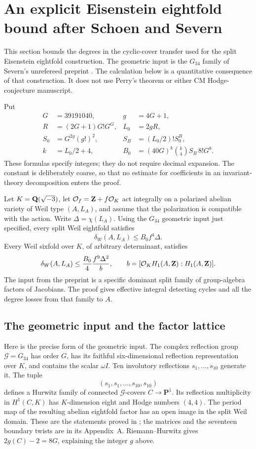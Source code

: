 \section{An explicit Eisenstein eightfold bound after Schoen and Severn}
\label{sec:eisenstein-eightfolds}
This section bounds the degrees in the cyclic-cover transfer used for the
split Eisenstein eightfold construction. The geometric input is the
$G_{34}$ family of Severn's unrefereed preprint
\cite[Proposition~8.5, \S9 and Appendix~A]{Severn}. The calculation below
is a quantitative consequence of that construction. It does not use
Perry's theorem or either CM Hodge-conjecture manuscript.

Put
\begin{align*}
 G&=39191040,& g&=4G+1,\\
 R&=(2G+1)G!G^G,& L_0&=2gR,\\
 S_0&=G^{2g}(g!)^2,& S_B&=(L_0/2)!S_0^R,\\
 k&=L_0/2+4,&
 B_0&=(40G)^k\binom{k}{4}S_B\,8!G^8.
\end{align*}
These formulas specify integers; they do not require decimal expansion.
The constant is deliberately coarse, so that no estimate for coefficients
in an invariant-theory decomposition enters the proof.

\begin{theorem}\label{thm:eisenstein-eightfolds}
Let $K=\mathbf Q(\sqrt{-3})$, let $\mathcal O_f=\mathbf Z+f\mathcal O_K$ act
integrally on a polarized abelian variety of Weil type $(A,L_A)$, and
assume that the polarization is compatible with the action. Write
$\Delta=\chi(L_A)$. Using the $G_{34}$ geometric input just specified,
every split Weil eightfold satisfies
\[
 \delta_W(A,L_A)\le B_0 f^4\Delta.
\]
Every Weil sixfold over $K$, of arbitrary determinant, satisfies
\[
 \delta_W(A,L_A)\le \frac{B_0}{4}
          \frac{f^9\Delta^2}{b},
 \qquad b=[\mathcal O_K H_1(A,\mathbf Z):H_1(A,\mathbf Z)].
\]
The input from the preprint is a specific dominant split family of
group-algebra factors of Jacobians. The proof gives effective integral
detecting cycles and all the degree losses from that family to $A$.
\end{theorem}

\subsection{The geometric input and the factor lattice}

Here is the precise form of the geometric input. The complex reflection
group $\mathcal G=G_{34}$ has order $G$, has its faithful six-dimensional
reflection representation over $K$, and contains the scalar $\omega I$.
Ten involutory reflections $s_1,\ldots,s_{10}$ generate it. The tuple
\[
 (s_1,s_1,\ldots,s_{10},s_{10})
\]
defines a Hurwitz family of connected $\mathcal G$-covers
$C\to\mathbf P^1$. Its reflection multiplicity in $H^1(C,K)$ has
$K$-dimension eight and Hodge numbers $(4,4)$. The period map of the
resulting abelian eightfold factor has an open image in the split Weil
domain. These are the statements proved in \cite[\S9]{Severn}; the
matrices and the seventeen boundary twists are in its Appendix~A.
Riemann--Hurwitz gives $2g(C)-2=8G$, explaining the integer $g$ above.

